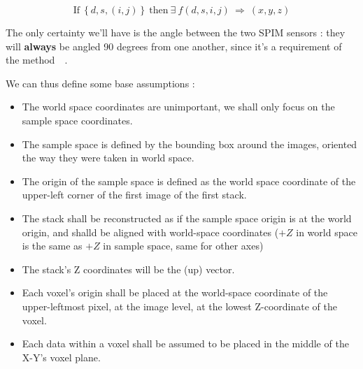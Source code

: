 \documentclass[a4paper]{article}
\begin{document}
{{{			$$
			\text{If}~\left\{d, s, (i, j)\right\}~\text{then}~\exists~f(d,s,i,j)~\Rightarrow~(x,y,z)\label{math:existence_of_3D_coordinates}
			$$

			The only certainty we'll have is the angle between the two SPIM sensors : they will \textbf{always} be angled 90 degrees from one another, since it's a requirement of the method~\cite{cite_spim_explication_original}~.

			We can thus define some base assumptions :

			\begin{itemize} \label{list:reconstruction_assumptions}
				\item \label{item:reconstruction_assumptions:00} The world space coordinates are unimportant, we shall only focus on the sample space coordinates.
				\item \label{item:reconstruction_assumptions:01} The sample space is defined by the bounding box around the images, oriented the way they were taken in world space.
				\item \label{item:reconstruction_assumptions:02} The origin of the sample space is defined as the world space coordinate of the upper-left corner of the first image of the first stack.
				\item \label{item:reconstruction_assumptions:03} The stack shall be reconstructed as if the sample space origin is at the world origin, and shalld be aligned with world-space coordinates ($+Z$ in world space is the same as $+Z$ in sample space, same for other axes)
				\item \label{item:reconstruction_assumptions:04} The stack's Z coordinates will be the (up) vector.
				\item \label{item:reconstruction_assumptions:05} Each voxel's origin shall be placed at the world-space coordinate of the upper-leftmost pixel, at the image level, at the lowest Z-coordinate of the voxel.
				\item \label{item:reconstruction_assumptions:06} Each data within a voxel shall be assumed to be placed in the middle of the X-Y's voxel plane.
			\end{itemize}
		}
	}

	
	
}
\end{document}
